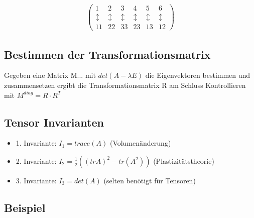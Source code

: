 \documentclass[a4paper]{scrartcl}
\begin{document}
\begin{align}
\begin{pmatrix}
1&2&3&4&5&6\\
\updownarrow&\updownarrow&\updownarrow&\updownarrow&\updownarrow&\updownarrow\\
11&22&33&23&13&12
\end{pmatrix}
\end{align}
\subsection{Bestimmen der Transformationsmatrix}

Gegeben eine Matrix M... mit $det(A-\lambda E)$ die Eigenvektoren bestimmen und zusammensetzen ergibt die Transformationsmatrix R am Schluss Kontrollieren mit $M^{diag}=R \cdot R^T$

\subsection{Tensor Invarianten}
\begin{itemize}
  \item 1. Invariante: $I_1 = trace(A)$ (Volumenänderung)
  \item 2. Invariante: $I_2 = \frac{1}{2} ((tr A)^2 - tr(A^2))$
  (Plastizitätstheorie)
  \item 3. Invariante: $I_3 = det(A)$ (selten benötigt für Tensoren)
\end{itemize}



\subsection{Beispiel}
\end{document}
